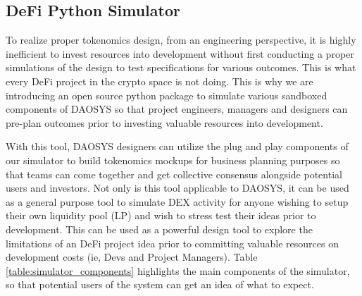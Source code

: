 \documentclass[journal,twocolumn,12pt]{ieeesyscoin}
\begin{document}
\subsection{DeFi Python Simulator}

To realize proper tokenomics design, from an engineering perspective, it is highly inefficient to invest resources into development without first conducting a proper simulations of the design to test specifications for various outcomes. This is what every DeFi project in the crypto space is not doing. This is why we are introducing an open source python package to simulate various sandboxed components of DAOSYS so that project engineers, managers and designers can pre-plan outcomes prior to investing valuable resources into development.

With this tool, DAOSYS designers can utilize the plug and play components of our simulator to build tokenomics mockups for business planning purposes so that teams can come together and get collective consensus alongside potential users and investors. Not only is this tool applicable to DAOSYS, it can be used as a general purpose tool to simulate DEX activity for anyone wishing to setup their own liquidity pool (LP) and wish to stress test their ideas prior to development. This can be used as a powerful design tool to explore the limitations of an DeFi project idea prior to committing valuable resources on development costs (ie, Devs and Project Managers). Table \ref{table:simulator_components} highlights the main components of the simulator, so that potential users of the system can get an idea of what to expect.
\end{document}
